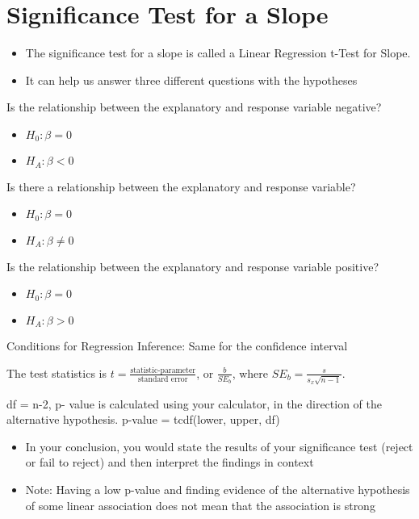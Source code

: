 \documentclass[../stats.tex]{subfiles}
\begin{document}
\section{Significance Test for a Slope}
\begin{itemize}
    \item The significance test for a slope is called a Linear Regression t-Test for Slope.
    \item It can help us answer three different questions with the hypotheses 
\end{itemize}

Is the relationship between the explanatory and response variable negative?
\begin{itemize}
    \item $H_0: \beta = 0$
    \item $H_A: \beta<0$
\end{itemize}

Is there a relationship between the explanatory and response variable?
\begin{itemize}
    \item $H_0:\beta=0$
    \item $H_A:\beta\neq 0$
\end{itemize}

Is the relationship between the explanatory and response variable positive?
\begin{itemize}
    \item $H_0:\beta=0$
    \item $H_A:\beta>0$
\end{itemize}

Conditions for Regression Inference: Same for the confidence interval 

The test statistics is $t=\frac{\text{statistic-parameter}}{\text{standard error}}$, or $\frac{b}{SE_b}$, where $SE_b=\frac{s}{s_x\sqrt{n-1}}$.

df = n-2, p- value is calculated using your calculator, in the direction of the alternative hypothesis. p-value = tcdf(lower, upper, df)

\begin{itemize}
    \item In your conclusion, you would state the results of your significance test (reject or fail to reject) and then interpret the findings in context 
    \item Note: Having a low p-value and finding evidence of the alternative hypothesis of some linear association does not mean that the association is strong 
\end{itemize}
\end{document}
